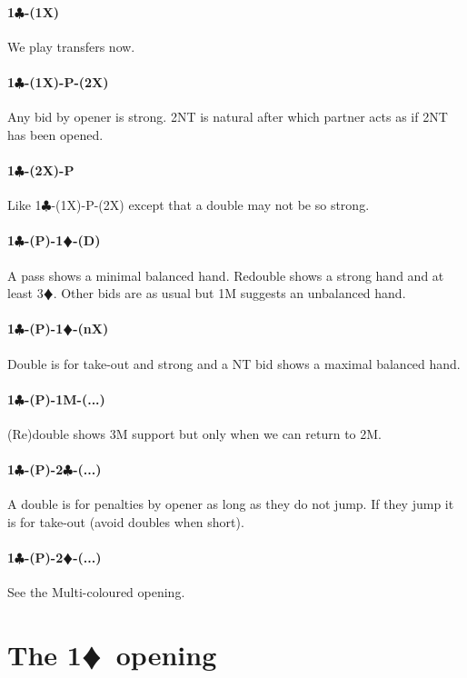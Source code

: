 \documentclass[a4paper]{article}
\newcommand{\BC}{\textcolor{OliveGreen}{$\clubsuit$}}
\newcommand{\BD}{\textcolor{RedOrange}{$\vardiamondsuit$}}
\newcommand{\pdfc}{\texorpdfstring{\BC{}}{C}}
\newcommand{\pdfd}{\texorpdfstring{\BD{}}{D}}
\begin{document}
\paragraph{1\pdfc-(1X)}

We play transfers now.
\bigbreak
\paragraph{1\pdfc-(1X)-P-(2X)}

Any bid by opener is strong. 2NT is natural after which partner acts as if 2NT has been opened.
\bigbreak
\paragraph{1\pdfc-(2X)-P}

Like 1\BC -(1X)-P-(2X) except that a double may not be so strong.
\bigbreak
\paragraph{1\pdfc-(P)-1\pdfd-(D)}

A pass shows a minimal balanced hand. Redouble shows a strong hand and at
least 3\BD . Other bids are as usual but 1M suggests an unbalanced hand.
\bigbreak
\paragraph{1\pdfc-(P)-1\pdfd-(nX)}

Double is for take-out and strong and a NT bid shows a maximal balanced hand.
\bigbreak
\paragraph{1\pdfc-(P)-1M-(...)}

(Re)double shows 3M support but only when we can return to 2M.
\bigbreak
\paragraph{1\pdfc-(P)-2\pdfc-(...)}

A double is for penalties by opener as long as they do not jump. If they jump
it is for take-out (avoid doubles when short).
\bigbreak
\paragraph{1\pdfc-(P)-2\pdfd-(...)}

See the Multi-coloured opening.
\bigbreak
\section{The 1\pdfd\ opening}
\end{document}
